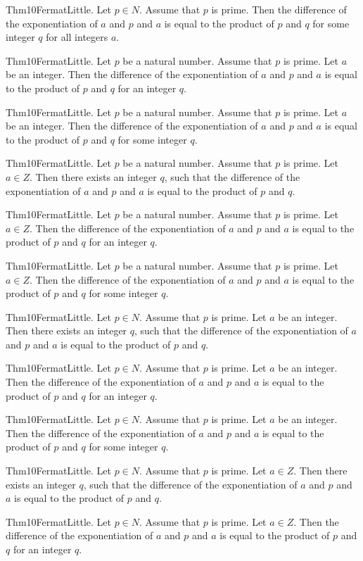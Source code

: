 \documentclass{article}
\begin{document}
Thm10FermatLittle. Let $p \in N$. Assume that $p$ is prime. Then the difference of the exponentiation of $a$ and $p$ and $a$ is equal to the product of $p$ and $q$ for some integer $q$ for all integers $a$.

Thm10FermatLittle. Let $p$ be a natural number. Assume that $p$ is prime. Let $a$ be an integer. Then the difference of the exponentiation of $a$ and $p$ and $a$ is equal to the product of $p$ and $q$ for an integer $q$.

Thm10FermatLittle. Let $p$ be a natural number. Assume that $p$ is prime. Let $a$ be an integer. Then the difference of the exponentiation of $a$ and $p$ and $a$ is equal to the product of $p$ and $q$ for some integer $q$.

Thm10FermatLittle. Let $p$ be a natural number. Assume that $p$ is prime. Let $a \in Z$. Then there exists an integer $q$, such that the difference of the exponentiation of $a$ and $p$ and $a$ is equal to the product of $p$ and $q$.

Thm10FermatLittle. Let $p$ be a natural number. Assume that $p$ is prime. Let $a \in Z$. Then the difference of the exponentiation of $a$ and $p$ and $a$ is equal to the product of $p$ and $q$ for an integer $q$.

Thm10FermatLittle. Let $p$ be a natural number. Assume that $p$ is prime. Let $a \in Z$. Then the difference of the exponentiation of $a$ and $p$ and $a$ is equal to the product of $p$ and $q$ for some integer $q$.

Thm10FermatLittle. Let $p \in N$. Assume that $p$ is prime. Let $a$ be an integer. Then there exists an integer $q$, such that the difference of the exponentiation of $a$ and $p$ and $a$ is equal to the product of $p$ and $q$.

Thm10FermatLittle. Let $p \in N$. Assume that $p$ is prime. Let $a$ be an integer. Then the difference of the exponentiation of $a$ and $p$ and $a$ is equal to the product of $p$ and $q$ for an integer $q$.

Thm10FermatLittle. Let $p \in N$. Assume that $p$ is prime. Let $a$ be an integer. Then the difference of the exponentiation of $a$ and $p$ and $a$ is equal to the product of $p$ and $q$ for some integer $q$.

Thm10FermatLittle. Let $p \in N$. Assume that $p$ is prime. Let $a \in Z$. Then there exists an integer $q$, such that the difference of the exponentiation of $a$ and $p$ and $a$ is equal to the product of $p$ and $q$.

Thm10FermatLittle. Let $p \in N$. Assume that $p$ is prime. Let $a \in Z$. Then the difference of the exponentiation of $a$ and $p$ and $a$ is equal to the product of $p$ and $q$ for an integer $q$.
\end{document}
